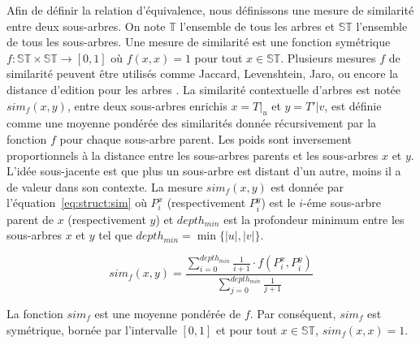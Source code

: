 Afin de définir la relation d'équivalence, nous définissons une mesure de similarité entre deux sous-arbres.
On note $\mathbb{T}$ l'ensemble de tous les arbres et $\mathbb{ST}$ l'ensemble de tous les sous-arbres.
Une mesure de similarité est une fonction symétrique $f : \mathbb{ST} \times \mathbb{ST} \to [0,1]$ où $f(x, x) = 1$ pour tout $x \in \mathbb{ST}$.
Plusieurs mesures $f$ de similarité peuvent être utilisés comme Jaccard, Levenshtein, Jaro, ou encore la distance d'edition pour les arbres \cite{zhangSimpleFastAlgorithms1989}.
La similarité contextuelle d'arbres est notée $sim_f(x, y)$, entre deux sous-arbres enrichis $x = T|_u$ et $y = T'|v$, est définie comme une moyenne pondérée des similarités donnée récursivement par la fonction $f$ pour chaque sous-arbre parent.
Les poids sont inversement proportionnels à la distance entre les sous-arbres parents et les sous-arbres $x$ et $y$.
L'idée sous-jacente est que plus un sous-arbre est distant d'un autre, moins il a de valeur dans son contexte.
La mesure $sim_f(x, y)$ est donnée par l'équation~\ref{eq:struct:sim} où $P^x_i$ (respectivement $P^y_i$) est le $i$-éme sous-arbre parent de $x$ (respectivement $y$) et $depth_{min}$ est la profondeur minimum entre les sous-arbres $x$ et $y$ tel que $depth_{min} = \min\{|u|, |v|\}$.

\begin{equation}
    sim_f(x, y) = \frac{\sum_{i=0}^{depth_{min}} \frac{1}{i + 1} \cdot f(P^x_i, P^y_i)}{\sum_{j=0}^{depth_{min}} \frac{1}{j + 1}} \label{eq:struct:sim}
\end{equation}

\begin{axiom}
    La fonction $sim_f$ est une moyenne pondérée de $f$.
    Par conséquent, $sim_f$ est symétrique, bornée par l'intervalle $[0, 1]$ et pour tout $x \in \mathbb{ST}$, $sim_f(x, x) = 1$.
\end{axiom}

